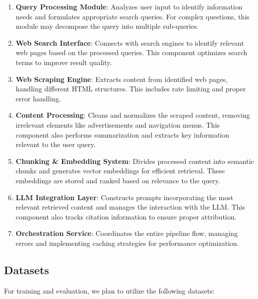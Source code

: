 \documentclass[fleqn,moreauthors,10pt]{ds_report}
\begin{document}
\begin{enumerate}[noitemsep]
    \item \textbf{Query Processing Module}: Analyzes user input to identify information needs and formulates appropriate search queries. For complex questions, this module may decompose the query into multiple sub-queries.
    
    \item \textbf{Web Search Interface}: Connects with search engines to identify relevant web pages based on the processed queries. This component optimizes search terms to improve result quality.
    
    \item \textbf{Web Scraping Engine}: Extracts content from identified web pages, handling different HTML structures. This includes rate limiting and proper error handling.
    
    \item \textbf{Content Processing}: Cleans and normalizes the scraped content, removing irrelevant elements like advertisements and navigation menus. This component also performs summarization and extracts key information relevant to the user query.
    
    \item \textbf{Chunking \& Embedding System}: Divides processed content into semantic chunks and generates vector embeddings for efficient retrieval. These embeddings are stored and ranked based on relevance to the query.
    
    \item \textbf{LLM Integration Layer}: Constructs prompts incorporating the most relevant retrieved content and manages the interaction with the LLM. This component also tracks citation information to ensure proper attribution.
    
    \item \textbf{Orchestration Service}: Coordinates the entire pipeline flow, managing errors and implementing caching strategies for performance optimization.
\end{enumerate}

\subsection*{Datasets}
For training and evaluation, we plan to utilize the following datasets:
\end{document}
